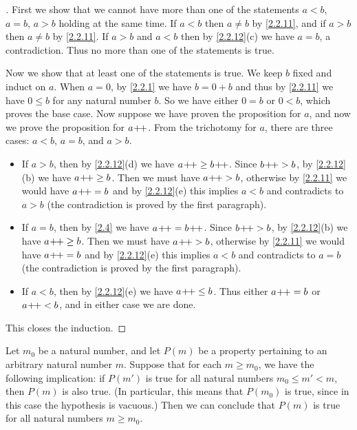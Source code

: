 \begin{proof}[]
  First we show that we cannot have more than one of the statements \(a < b\), \(a = b\), \(a > b\) holding at the same time.
  If \(a < b\) then \(a \neq b\) by \cref{2.2.11}, and if \(a > b\) then \(a \neq b\) by \cref{2.2.11}.
  If \(a > b\) and \(a < b\) then by \cref{2.2.12}(c) we have \(a = b\), a contradiction.
  Thus no more than one of the statements is true.

  Now we show that at least one of the statements is true.
  We keep \(b\) fixed and induct on \(a\).
  When \(a = 0\), by \cref{2.2.1} we have \(b = 0 + b\) and thus by \cref{2.2.11} we have \(0 \leq b\) for any natural number \(b\).
  So we have either \(0 = b\) or \(0 < b\), which proves the base case.
  Now suppose we have proven the proposition for \(a\), and now we prove the proposition for \(a\!+\!\!+\).
  From the trichotomy for \(a\), there are three cases: \(a < b\), \(a = b\), and \(a > b\).
  \begin{itemize}
    \item If \(a > b\), then by \cref{2.2.12}(d) we have \(a\!+\!\!+ \geq b\!+\!\!+\).
          Since \(b\!+\!\!+ > b\), by \cref{2.2.12}(b) we have \(a\!+\!\!+ \geq b\).
          Then we must have \(a\!+\!\!+ > b\), otherwise by \cref{2.2.11} we would have \(a\!+\!\!+ = b\) and by \cref{2.2.12}(e) this implies \(a < b\) and contradicts to \(a > b\)
          (the contradiction is proved by the first paragraph).
    \item If \(a = b\), then by \cref{2.4} we have \(a\!+\!\!+ = b\!+\!\!+\).
          Since \(b\!+\!\!+ > b\), by \cref{2.2.12}(b) we have \(a\!+\!\!+ \geq b\).
          Then we must have \(a\!+\!\!+ > b\), otherwise by \cref{2.2.11} we would have \(a\!+\!\!+ = b\) and by \cref{2.2.12}(e) this implies \(a < b\) and contradicts to \(a = b\)
          (the contradiction is proved by the first paragraph).
    \item If \(a < b\), then by \cref{2.2.12}(e) we have \(a\!+\!\!+ \leq b\).
          Thus either \(a\!+\!\!+ = b\) or \(a\!+\!\!+ < b\), and in either case we are done.
  \end{itemize}
  This closes the induction.
\end{proof}

\begin{prop}\label{2.2.14}
  Let \(m_0\) be a natural number, and let \(P(m)\) be a property pertaining to an arbitrary natural number \(m\).
  Suppose that for each \(m \geq m_0\), we have the following implication: if \(P(m')\) is true for all natural numbers \(m_0 \leq m' < m\), then \(P(m)\) is also true.
  (In particular, this means that \(P(m_0)\) is true, since in this case the hypothesis is vacuous.)
  Then we can conclude that \(P(m)\) is true for all natural numbers \(m \geq m_0\).
\end{prop}

